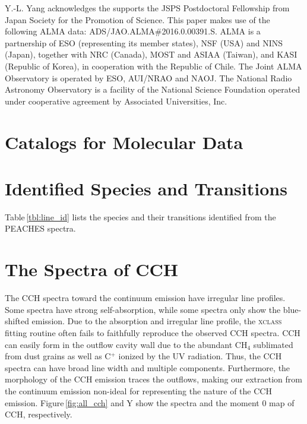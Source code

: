 \documentclass[twocolumn]{aastex62}
\begin{document}
\acknowledgements
Y.-L. Yang acknowledges the supports the JSPS Postdoctoral Fellowship from Japan Society for the Promotion of Science.  This paper makes use of the following ALMA data: ADS/JAO.ALMA\#2016.0.00391.S. ALMA is a partnership of ESO (representing its member states), NSF (USA) and NINS (Japan), together with NRC (Canada), MOST and ASIAA (Taiwan), and KASI (Republic of Korea), in cooperation with the Republic of Chile. The Joint ALMA Observatory is operated by ESO, AUI/NRAO and NAOJ.  The National Radio Astronomy Observatory is a facility of the National Science Foundation operated under cooperative agreement by Associated Universities, Inc.



\appendix
\section{Catalogs for Molecular Data}
\label{sec:catalogs}

\section{Identified Species and Transitions}
Table\,\ref{tbl:line_id} lists the species and their transitions identified from the PEACHES spectra.


\section{The Spectra of CCH}
The CCH spectra toward the continuum emission have irregular line profiles.  Some spectra have strong self-absorption, while some spectra only show the blue-shifted emission.  Due to the absorption and irregular line profile, the \textsc{xclass} fitting routine often fails to faithfully reproduce the observed CCH spectra.  CCH can easily form in the outflow cavity wall due to the abundant CH$_{4}$ sublimated from dust grains as well as C$^+$ ionized by the UV radiation.  Thus, the CCH spectra can have broad line width and multiple components.  Furthermore, the morphology of the CCH emission traces the outflows, making our extraction from the continuum emission non-ideal for representing the nature of the CCH emission.  Figure\,\ref{fig:all_cch} and Y show the spectra and the moment 0 map of CCH, respectively.
\end{document}
